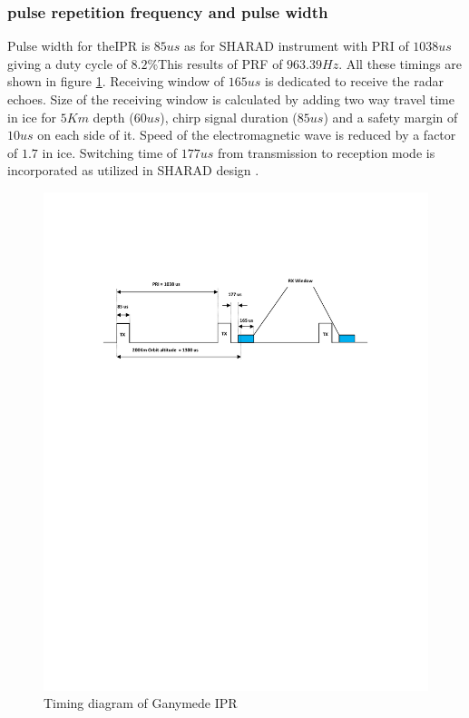 \subsubsection{pulse repetition frequency and pulse width}
Pulse width for the\ac{IPR} is $85 us $ as for \ac{SHARAD} instrument with \ac{PRI} of $1038 us$ giving a duty cycle of $8.2\% $This results of \ac{PRF} of $963.39 Hz$. All these timings are shown in figure \ref{fig:PRI}. Receiving window of $165 us$ is dedicated to receive the radar echoes. Size of the receiving window is calculated by adding two way travel time in ice for $5 Km $ depth ($60 us$), chirp signal duration ($85 us$) and  a safety margin of $10 us$ on each side of it. Speed of the electromagnetic wave is reduced by a factor of $1.7$ in ice. Switching time of $177 us$ from transmission to reception mode is incorporated as utilized in \ac{SHARAD} design \cite{SHARAD}.
%
\begin{figure}[bht]
\centering
\includegraphics[scale=0.7]{Figures/PRI.pdf}
\caption{Timing diagram of Ganymede \ac{IPR}} 
\label{fig:PRI}
\end{figure}
%

